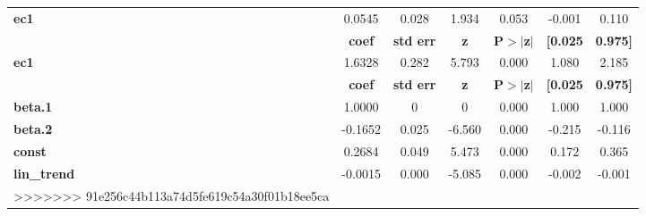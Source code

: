 \begin{center}
\begin{tabular}{lcccccc}
\midrule
\textbf{ec1} &       0.0545  &        0.028     &     1.934  &         0.053        &       -0.001    &        0.110     \\
             & \textbf{coef} & \textbf{std err} & \textbf{z} & \textbf{P$> |$z$|$} & \textbf{[0.025} & \textbf{0.975]}  \\
\midrule
\textbf{ec1} &       1.6328  &        0.282     &     5.793  &         0.000        &        1.080    &        2.185     \\
                    & \textbf{coef} & \textbf{std err} & \textbf{z} & \textbf{P$> |$z$|$} & \textbf{[0.025} & \textbf{0.975]}  \\
\midrule
\textbf{beta.1}     &       1.0000  &            0     &         0  &         0.000        &        1.000    &        1.000     \\
\textbf{beta.2}     &      -0.1652  &        0.025     &    -6.560  &         0.000        &       -0.215    &       -0.116     \\
\textbf{const}      &       0.2684  &        0.049     &     5.473  &         0.000        &        0.172    &        0.365     \\
\textbf{lin\_trend} &      -0.0015  &        0.000     &    -5.085  &         0.000        &       -0.002    &       -0.001     \\
>>>>>>> 91e256c44b113a74d5fe619c54a30f01b18ee5ca
\bottomrule
\end{tabular}
\end{center}